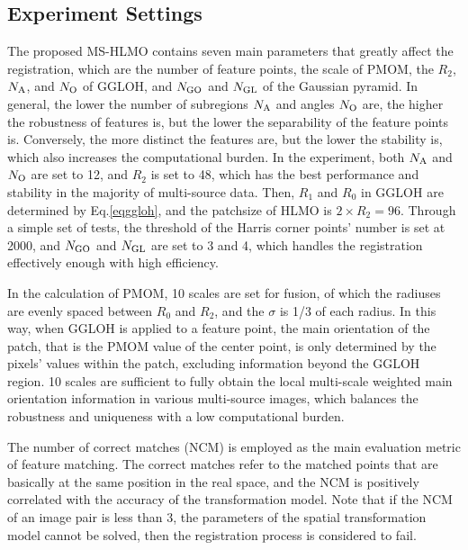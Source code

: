 \subsection{Experiment Settings}
\label{ssec:para}
The proposed MS-HLMO contains seven main parameters that greatly affect the registration, which are the number of feature points, the scale of PMOM, the $R_2$, ${N_{\rm{A}}}$, and ${N_{\rm{O}}}$ of GGLOH, and ${N_{\rm{GO}}}$ and ${N_{\rm{GL}}}$ of the Gaussian pyramid. In general, the lower the number of subregions ${N_{\rm{A}}}$ and angles ${N_{\rm{O}}}$ are, the higher the robustness of features is, but the lower the separability of the feature points is. Conversely, the more distinct the features are, but the lower the stability is, which also increases the computational burden. In the experiment, both ${N_{\rm{A}}}$ and ${N_{\rm{O}}}$ are set to 12, and $R_2$ is set to 48, which has the best performance and stability in the majority of multi-source data. Then, $R_1$ and $R_0$ in GGLOH are determined by Eq.\ref{eqggloh}, and the patchsize of HLMO is $2\times R_2 = 96$. Through a simple set of tests, the threshold of the Harris corner points' number is set at 2000, and ${N_{\rm{GO}}}$ and ${N_{\rm{GL}}}$ are set to 3 and 4, which handles the registration effectively enough with high efficiency.

In the calculation of PMOM, 10 scales are set for fusion, of which the radiuses are evenly spaced between $R_0$ and $R_2$, and the $\sigma$ is 1/3 of each radius. In this way, when GGLOH is applied to a feature point, the main orientation of the patch, that is the PMOM value of the center point, is only determined by the pixels' values within the patch, excluding information beyond the GGLOH region. 10 scales are sufficient to fully obtain the local multi-scale weighted main orientation information in various multi-source images, which balances the robustness and uniqueness with a low computational burden.

The number of correct matches (NCM) is employed as the main evaluation metric of feature matching. The correct matches refer to the matched points that are basically at the same position in the real space, and the NCM is positively correlated with the accuracy of the transformation model. Note that if the NCM of an image pair is less than 3, the parameters of the spatial transformation model cannot be solved, then the registration process is considered to fail.

